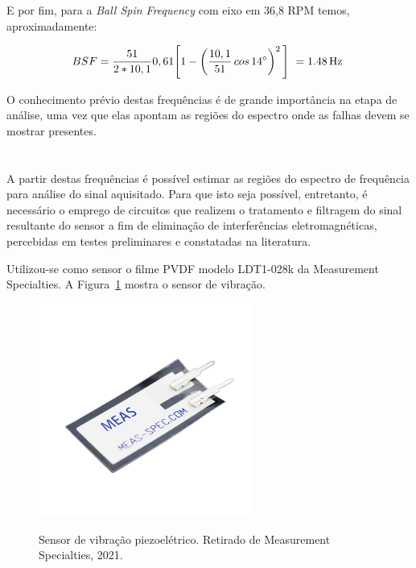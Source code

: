 \documentclass[
	12pt,				
	oneside,			
	a4paper,			
	english,			
	brazil,			
	]{abntex2ppgsi}
\begin{document}
E por fim, para a \textit{Ball Spin Frequency} com eixo em 36,8 RPM temos, aproximadamente:

\begin{equation}
	BSF = \frac{51}{2*10,1}0,61 \Bigg[  1 - \left ( \frac{10,1}{51} \,cos \, \ang{14} \right ) ^{2}  \Bigg] \ = \SI{1,48}{{\hertz}} \
	\label{eq: BSF no rolamento}
\end{equation}


O conhecimento prévio destas frequências é de grande importância na etapa de análise, uma vez que elas apontam as regiões do espectro onde as falhas devem se mostrar presentes.

\section{}

A partir destas frequências é possível estimar as regiões do espectro de frequência para análise do sinal aquisitado. Para que isto seja possível, entretanto, é necessário o emprego de circuitos que realizem o tratamento e filtragem do sinal resultante do sensor a fim de eliminação de interferências eletromagnéticas, percebidas em testes preliminares e constatadas na literatura.  

Utilizou-se como sensor o filme PVDF modelo LDT1-028k da Measurement Specialties. A Figura~\ref{Figura21} mostra o sensor de vibração. 

\begin{figure}[H]
\centering
\caption {Sensor de vibração piezoelétrico. Retirado de Measurement Specialties, 2021.}
\includegraphics[width=\textwidth,height=70mm,keepaspectratio]{Figura21} 
\label{Figura21}
\end{figure} 
\end{document}

